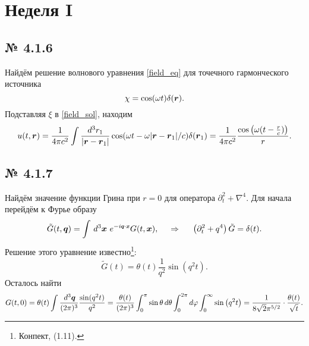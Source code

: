 \section{Неделя I}

\subsection*{№ 4.1.6}

Найдём решение волнового уравнения \eqref{field_eq} для точечного гармонческого источника
\begin{equation*}
    \chi = \cos(\omega t) \delta(\mbox{\boldmath $r$}).
\end{equation*}
Подставляя $\xi$ в \eqref{field_sol}, находим
\begin{equation*}
    u(t, \mbox{\boldmath $r$}) = \frac{1}{4 \pi c^2} \int \frac{d^3 r_1}{|\mbox{\boldmath $r$} - \mbox{\boldmath $r$}_1|} \cos(\omega t - \omega |\mbox{\boldmath $r$} - \mbox{\boldmath $r$}_1|/c) \delta(\mbox{\boldmath $r$}_1) = 
    \frac{1}{4 \pi c^2} \frac{\cos\left(\omega (t - \frac{r}{c})\right)}{r} .
\end{equation*}




\subsection*{№ 4.1.7}

Найдём значение функции Грина при $r=0$ для оператора $\partial_t^2 + \nabla^4$. Для начала перейдём к Фурье образу
\begin{equation*}
    \tilde{G}(t, \vc{q}) = \int \d^3 \vc{x} \ e^{-i \smallvc{q} \cdot \smallvc{x}} G(t, \vc{x}),
    \hspace{0.5cm} \Rightarrow \hspace{0.5cm}
    \left(\partial_t^2 + q^4\right) \tilde{G} = \delta(t).
\end{equation*}
Решение этого уравнение известно\footnote{
    Конпект, (1.11).
}:
\begin{equation*}
    \tilde{G}(t) = \theta(t) \frac{1}{q^2} \sin\left(q^2 t\right).
\end{equation*}
Осталось найти 
\begin{equation*}
    G(t, 0) = \theta(t) \int \frac{\, d^3 \mbox{\boldmath $q$}}{(2 \pi)^3} \frac{\sin( q^2 t)}{q^2} = \frac{\theta(t)}{(2\pi)^3}
    \int_{0}^{\pi} \sin \theta \, d \theta \int_{0}^{2\pi} d \varphi \int_{0}^{\infty} \sin\left(q^2 t\right) = \frac{1}{8 \sqrt{2} \pi ^{5/2}} \cdot \frac{\theta(t) }{\sqrt{t}}.
\end{equation*}

